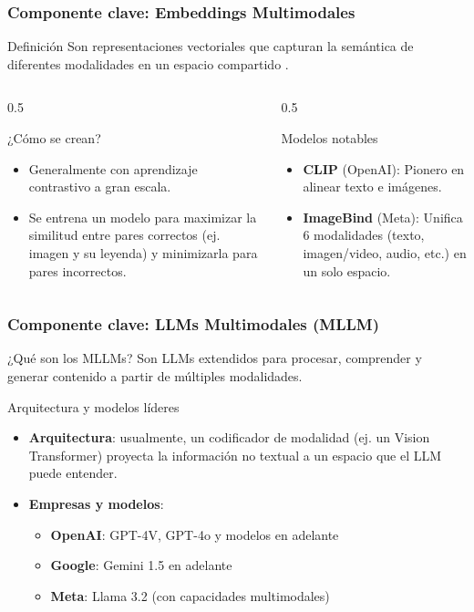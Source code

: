 \documentclass[handout]{beamer}
\begin{document}
\begin{frame}
\frametitle{Componente clave: Embeddings Multimodales}
\begin{block}{Definición}
Son representaciones vectoriales que capturan la semántica de diferentes modalidades en un espacio compartido \parencite{radford2021learningtransferablevisualmodels}.
\end{block}
\begin{columns}[T]
\begin{column}{0.5\textwidth}
\begin{block}{¿Cómo se crean?}
\begin{itemize}
    \item Generalmente con aprendizaje contrastivo a gran escala.
    \item Se entrena un modelo para maximizar la similitud entre pares correctos (ej. imagen y su leyenda) y minimizarla para pares incorrectos.
\end{itemize}
\end{block}
\end{column}
\begin{column}{0.5\textwidth}
\begin{block}{Modelos notables}
\begin{itemize}
    \item \textbf{CLIP} (OpenAI): Pionero en alinear texto e imágenes.
    \item \textbf{ImageBind} (Meta): Unifica 6 modalidades (texto, imagen/video, audio, etc.) en un solo espacio.
\end{itemize}
\end{block}
\end{column}
\end{columns}
\end{frame}

\begin{frame}
\frametitle{Componente clave: LLMs Multimodales (MLLM)}
\begin{block}{¿Qué son los MLLMs?}
Son LLMs extendidos para procesar, comprender y generar contenido a partir de múltiples modalidades.
\end{block}
\begin{block}{Arquitectura y modelos líderes}
\begin{itemize}
    \item \textbf{Arquitectura}: usualmente, un codificador de modalidad (ej. un Vision Transformer) proyecta la información no textual a un espacio que el LLM puede entender.
    \item \textbf{Empresas y modelos}:
    \begin{itemize}
        \item \textbf{OpenAI}: GPT-4V, GPT-4o y modelos en adelante
        \item \textbf{Google}: Gemini 1.5 en adelante
        \item \textbf{Meta}: Llama 3.2 (con capacidades multimodales)
    \end{itemize}
\end{itemize}
\end{block}
\end{frame}
\end{document}
